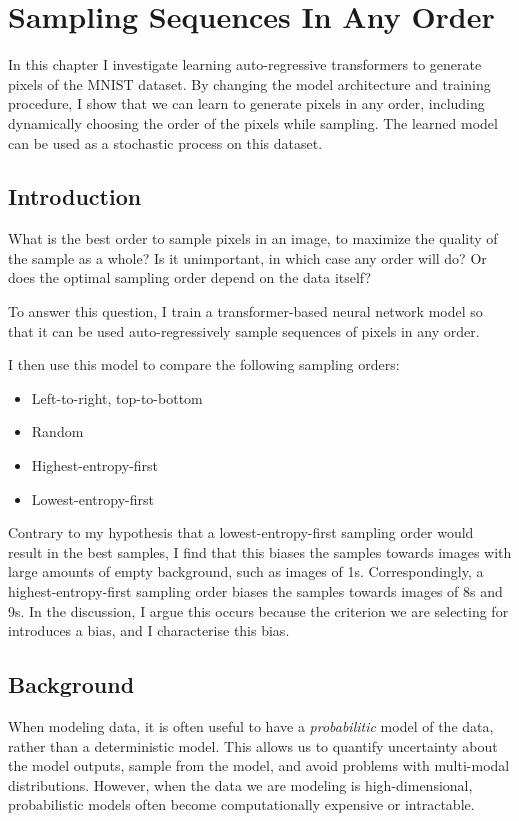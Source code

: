 \chapter{Sampling Sequences In Any Order}
\label{C:a-o-sampling}

In this chapter I investigate learning auto-regressive transformers to generate pixels of the MNIST dataset. By changing the model architecture and training procedure, I show that we can learn to generate pixels in any order, including dynamically choosing the order of the pixels while sampling. The learned model can be used as a stochastic process on this dataset.

\section{Introduction}

What is the best order to sample pixels in an image, to maximize the quality of the sample as a whole? Is it unimportant, in which case any order will do? Or does the optimal sampling order depend on the data itself?

To answer this question, I train a transformer-based neural network model so that it can be used auto-regressively sample sequences of pixels in any order.

I then use this model to compare the following sampling orders:
\begin{itemize}
    \item Left-to-right, top-to-bottom
    \item Random
    \item Highest-entropy-first
    \item Lowest-entropy-first
\end{itemize}

Contrary to my hypothesis that a lowest-entropy-first sampling order would result in the best samples, I find that this biases the samples towards images with large amounts of empty background, such as images of 1s. Correspondingly, a highest-entropy-first sampling order biases the samples towards images of 8s and 9s. In the discussion, I argue this occurs because the criterion we are selecting for introduces a bias, and I characterise this bias.

\section{Background}

When modeling data, it is often useful to have a \textit{probabilitic} model of the data, rather than a deterministic model. This allows us to quantify uncertainty about the model outputs, sample from the model, and avoid problems with multi-modal distributions. However, when the data we are modeling is high-dimensional, probabilistic models often become computationally expensive or intractable.

